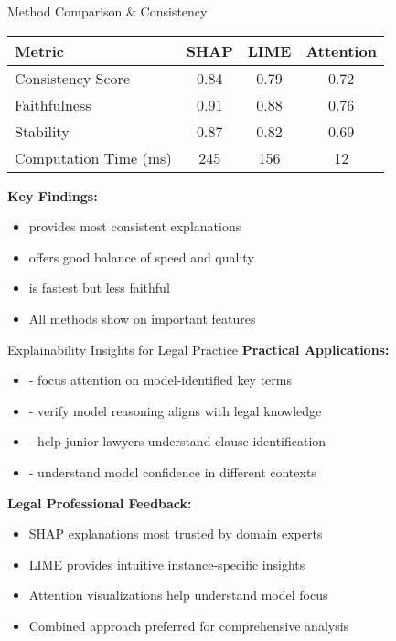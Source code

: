 \begin{frame}{Method Comparison \& Consistency}
\begin{table}[h]
\centering
\begin{tabular}{@{}lccc@{}}
\toprule
\textbf{Metric} & \textbf{SHAP} & \textbf{LIME} & \textbf{Attention} \\
\midrule
Consistency Score & 0.84 & 0.79 & 0.72 \\
Faithfulness & 0.91 & 0.88 & 0.76 \\
Stability & 0.87 & 0.82 & 0.69 \\
Computation Time (ms) & 245 & 156 & 12 \\
\bottomrule
\end{tabular}
\end{table}

\vspace{0.5cm}
\textbf{Key Findings:}
\begin{itemize}
    \item {} provides most consistent explanations
    \item {} offers good balance of speed and quality
    \item {} is fastest but less faithful
    \item All methods show  on important features
\end{itemize}
\end{frame}

\begin{frame}{Explainability Insights for Legal Practice}
\textbf{Practical Applications:}
\begin{itemize}
    \item {} - focus attention on model-identified key terms
    \item {} - verify model reasoning aligns with legal knowledge
    \item {} - help junior lawyers understand clause identification
    \item {} - understand model confidence in different contexts
\end{itemize}

\vspace{0.5cm}
\textbf{Legal Professional Feedback:}
\begin{itemize}
    \item SHAP explanations most trusted by domain experts
    \item LIME provides intuitive instance-specific insights
    \item Attention visualizations help understand model focus
    \item Combined approach preferred for comprehensive analysis
\end{itemize}
\end{frame}
